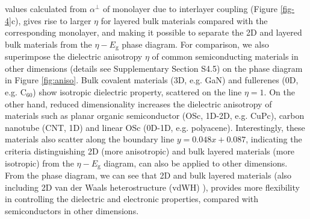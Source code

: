 \documentclass[journal=ancac3,manuscript=article,email=true,hyperref=true,keywords=false]{achemso}
\begin{document}
values calculated from $\alpha^{\perp}$ of monolayer due to interlayer
coupling (Figure \ref{fig-4}c), gives rise to larger $\eta$ for
layered bulk materials compared with the corresponding monolayer, and
making it possible to separate the 2D and layered bulk materials from
the $\eta-E_{\mathrm{g}}$ phase diagram. For comparison, we also
superimpose the dielectric anisotropy $\eta$ of common semiconducting
materials in other dimensions (details see Supplementary Section S4.5)
on the phase diagram in Figure \ref{fig:aniso}. Bulk covalent
materials (3D, e.g. GaN) and fullerenes (0D, e.g. C$_{60}$) show
isotropic dielectric property, scattered on the line $\eta=1$. On the
other hand, reduced dimensionality increases the dielectric anisotropy
of materials such as planar organic semiconductor (OSc, 1D-2D,
e.g. CuPc), carbon nanotube (CNT, 1D) and linear OSc (0D-1D,
e.g. polyacene). Interestingly, these materials also scatter along the
boundary line $y=0.048x+0.087$, indicating the criteria distinguishing
2D (more anisotropic) and bulk layered materials (more isotropic) from
the $\eta-E_{\mathrm{g}}$ diagram, can also be applied to other
dimensions. From the phase diagram, we can see that 2D and bulk
layered materials (also including 2D van der Waals heterostructure
(vdWH) \cite{Novoselov_2016}), provides more flexibility in
controlling the dielectric and electronic properties, compared with
semiconductors in other dimensions.
\end{document}
